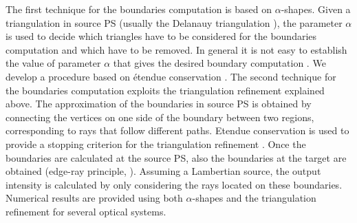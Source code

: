 The first technique for the boundaries computation is based on $\alpha$-shapes. 
Given a triangulation in source PS (usually the Delanauy triangulation \cite{marsden2003texts}), the parameter $\alpha$ is used to decide which triangles have to be considered for the boundaries computation and which have to be removed. In general it is not easy to establish the value of parameter $\alpha$ that gives the desired boundary computation \cite{teichmann1998surface}. We develop a procedure based on \'{e}tendue conservation \cite{filosa2015new}. The second technique for the boundaries computation exploits the triangulation refinement explained above. The approximation of the boundaries in source PS is obtained by connecting the vertices on one side of the boundary between two regions, corresponding to rays that follow different paths.
Etendue conservation is used to provide a stopping criterion for the triangulation refinement \cite{filosa2016ray, filosa2017phase}.  
Once the boundaries are calculated at the source PS, also the boundaries at the target are obtained (edge-ray principle, \cite{Ries:2}). Assuming a Lambertian source, the output intensity is calculated by only considering the rays located on these boundaries. 
\\ \indent 
Numerical results are provided using both $\alpha$-shapes and the triangulation refinement for several optical systems.
